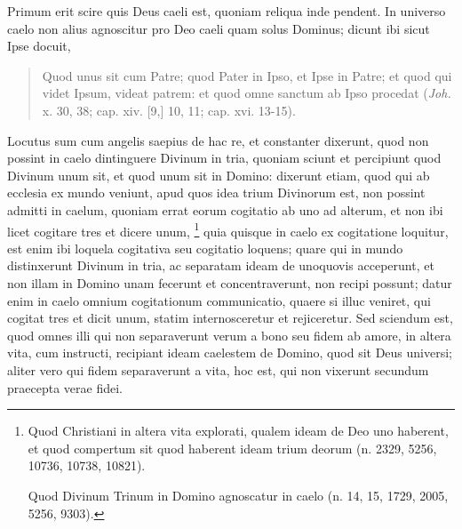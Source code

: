 
\begin{topic}{2}
    Primum erit scire quis Deus caeli est, quoniam reliqua inde pendent.
    In universo caelo non alius agnoscitur pro Deo caeli quam solus Dominus; dicunt ibi sicut Ipse docuit,
    \begin{quote}
        Quod unus sit cum Patre; quod Pater in Ipso, et Ipse in Patre; et quod qui videt Ipsum, videat patrem: et quod
        omne sanctum ab Ipso procedat (\emph{Joh.} x. 30, 38; cap. xiv. [9,] 10, 11; cap. xvi. 13-15).
    \end{quote}
    Locutus sum cum angelis saepius de hac re, et constanter dixerunt, quod non possint in caelo dintinguere Divinum in
    tria, quoniam sciunt et percipiunt quod Divinum unum sit, et quod unum sit in Domino: dixerunt etiam, quod qui ab
    ecclesia ex mundo veniunt, apud quos idea trium Divinorum est, non possint admitti in caelum, quoniam errat eorum
    cogitatio ab uno ad alterum, et non ibi licet cogitare tres et dicere unum,
    \footnote{
        Quod Christiani in altera vita explorati, qualem ideam de Deo uno haberent, et quod compertum sit quod haberent
        ideam trium deorum (n. 2329, 5256, 10736, 10738, 10821).

        Quod Divinum Trinum in Domino agnoscatur in caelo (n. 14, 15, 1729, 2005, 5256, 9303).
    }
    quia quisque in caelo ex cogitatione loquitur, est enim ibi loquela cogitativa seu cogitatio loquens; quare qui in
    mundo distinxerunt Divinum in tria, ac separatam ideam de unoquovis acceperunt, et non illam in Domino unam
    fecerunt et concentraverunt, non recipi possunt; datur enim in caelo omnium cogitationum communicatio, quaere si
    illuc veniret, qui cogitat tres et dicit unum, statim internosceretur et rejiceretur.
    Sed sciendum est, quod omnes illi qui non separaverunt verum a bono seu fidem ab amore, in altera vita, cum
    instructi, recipiant ideam caelestem de Domino, quod sit Deus universi; aliter vero qui fidem separaverunt a vita,
    hoc est, qui non vixerunt secundum praecepta verae fidei.
\end{topic}


